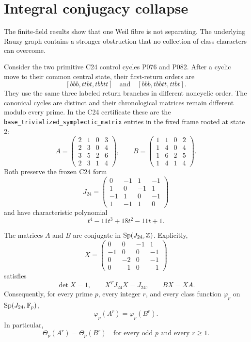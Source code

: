 \section{Integral conjugacy collapse}
\label{sec:conjugacy}

The finite-field results show that one Weil fibre is not separating.  The
underlying Rauzy graph contains a stronger obstruction that no collection of
class characters can overcome.

Consider the two primitive C24 control cycles P076 and P082.  After a cyclic
move to their common central state, their first-return orders are
\[
[bbb,ttbt,tbbtt]
\quad\text{and}\quad
[bbb,tbbtt,ttbt].
\]
They use the same three labeled return branches in different noncyclic order.
The canonical cycles are distinct and their chronological matrices remain
different modulo every prime.  In the C24 certificate these are the
\texttt{base\_trivialized\_symplectic\_matrix} entries in the fixed frame rooted at
state 2:
\[
A=
\begin{pmatrix}
2&1&0&3\\
2&3&0&4\\
3&5&2&6\\
2&3&1&4
\end{pmatrix},
\qquad
B=
\begin{pmatrix}
1&1&0&2\\
1&4&0&4\\
1&6&2&5\\
1&4&1&4
\end{pmatrix}.
\]
Both preserve the frozen C24 form
\[
J_{24}=
\begin{pmatrix}
0&-1&1&-1\\
1&0&-1&1\\
-1&1&0&-1\\
1&-1&1&0
\end{pmatrix}
\]
and have characteristic polynomial
\[
t^4-11t^3+18t^2-11t+1.
\]

\begin{theorem}
\label{thm:integral-conjugacy}
The matrices \(A\) and \(B\) are conjugate in
\(\operatorname{Sp}(J_{24},\mathbb{Z})\).  Explicitly,
\[
X=
\begin{pmatrix}
0&0&-1&1\\
-1&0&0&-1\\
0&-2&0&-1\\
0&-1&0&-1
\end{pmatrix}
\]
satisfies
\[
\det X=1,
\qquad
X^TJ_{24}X=J_{24},
\qquad
BX=XA.
\]
Consequently, for every prime \(p\), every integer \(r\), and every class
function \(\varphi_p\) on \(\operatorname{Sp}(J_{24},\mathbb{F}_p)\),
\[
\varphi_p(A^r)=\varphi_p(B^r).
\]
In particular,
\[
\Theta_p(A^r)=\Theta_p(B^r)
\quad\text{for every odd }p\text{ and every }r\ge1.
\]
\end{theorem}

